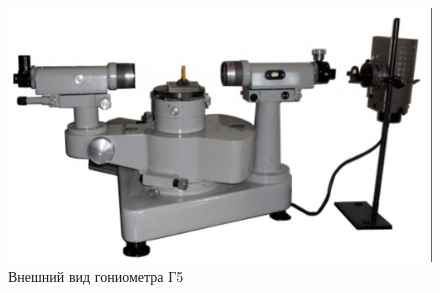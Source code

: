 \documentclass{article}
\begin{document}
\begin{figure}[h!]
	\includegraphics[scale=0.3]{honiometr.png}
	\centering
	\caption{Внешний вид гониометра Г5}
\end{figure}

\newpage
\end{document}
